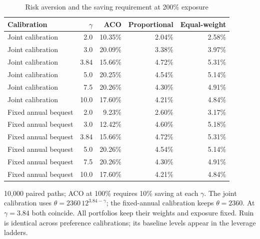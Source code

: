 \begin{table}[H]
\centering\small
\caption{Risk aversion and the saving requirement at 200\% exposure}\label{tab:aco-gamma}
\begin{tabular}{lrrrr}\toprule
Calibration & $\gamma$ & ACO & Proportional & Equal-weight \\
\midrule
Joint calibration & 2.0 & 10.35\% & 2.04\% & 2.58\% \\
Joint calibration & 3.0 & 20.09\% & 3.38\% & 3.97\% \\
Joint calibration & 3.84 & 15.66\% & 4.72\% & 5.31\% \\
Joint calibration & 5.0 & 20.25\% & 4.54\% & 5.14\% \\
Joint calibration & 7.5 & 20.26\% & 4.30\% & 4.91\% \\
Joint calibration & 10.0 & 17.60\% & 4.21\% & 4.84\% \\
Fixed annual bequest & 2.0 & 9.23\% & 2.60\% & 3.17\% \\
Fixed annual bequest & 3.0 & 12.42\% & 4.60\% & 5.18\% \\
Fixed annual bequest & 3.84 & 15.66\% & 4.72\% & 5.31\% \\
Fixed annual bequest & 5.0 & 20.26\% & 4.54\% & 5.14\% \\
Fixed annual bequest & 7.5 & 20.26\% & 4.30\% & 4.91\% \\
Fixed annual bequest & 10.0 & 17.60\% & 4.21\% & 4.84\% \\
\bottomrule\end{tabular}
\par\smallskip\begin{minipage}{0.96\textwidth}\footnotesize
10,000 paired paths; ACO at 100\% requires 10\% saving at each $\gamma$. The joint calibration uses $\theta=2360\,12^{3.84-\gamma}$; the fixed-annual calibration keeps $\theta=2360$. At $\gamma=3.84$ both coincide. All portfolios keep their weights and exposure fixed. Ruin is identical across preference calibrations; its baseline levels appear in the leverage ladders.
\end{minipage}\end{table}
